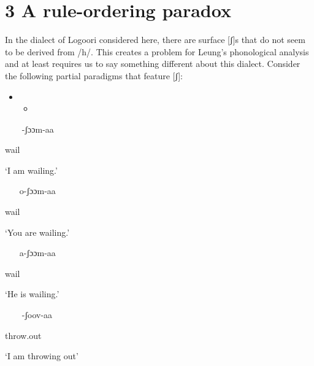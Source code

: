 \chapter{3 A rule-ordering paradox}

In the dialect of Logoori considered here, there are surface [ʃ]s that do not seem to be derived from /h/. This creates a problem for Leung’s phonological analysis and at least requires us to say something different about this dialect. Consider the following partial paradigms that feature [ʃ]:

\setcounter{itemize}{0}
\begin{itemize}
\item \setcounter{itemize}{0}
\begin{itemize}
\item \end{itemize}
\end{itemize}
\setcounter{itemize}{0}
\begin{itemize}
\item [-ʃɔɔm-aa]

\end{itemize}

wail  

‘I am wailing.’

\begin{itemize}
\item [o-ʃɔɔm-aa] 

\end{itemize}

wail  

‘You are wailing.’

\begin{itemize}
\item [a-ʃɔɔm-aa] 

\end{itemize}

wail

‘He is wailing.’

\begin{itemize}
\item [-ʃoov-aa]  

\end{itemize}

throw.out 

‘I am throwing out’

